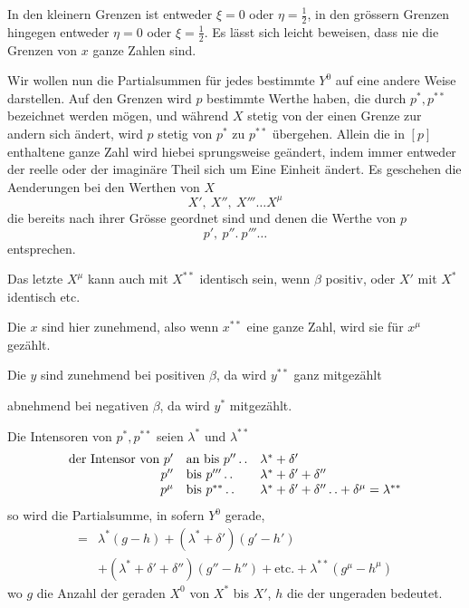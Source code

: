 In den kleinern Grenzen ist entweder $\xi=0$ oder $\eta=\frac12$, in den grössern Grenzen hingegen entweder $\eta=0$ oder $\xi=\frac12$. Es lässt sich leicht beweisen, dass nie die Grenzen von $x$ ganze Zahlen sind.

Wir wollen nun die Partialsummen für jedes bestimmte $Y^0$ auf eine andere Weise darstellen. Auf den Grenzen wird $p$ bestimmte Werthe haben, die durch $p^*,p^{**}$ bezeichnet werden mögen, und während $X$ stetig von der einen Grenze zur andern sich ändert, wird $p$ stetig von $p^*$ zu $p^{**}$ übergehen. Allein die in $[p]$ enthaltene ganze Zahl wird hiebei sprungsweise geändert, indem immer entweder der reelle oder der imaginäre Theil sich um Eine Einheit ändert. Es geschehen die Aenderungen bei den Werthen von $X$
\[
X',\ X'',\ X'''\ldots X^\mu
\]
die bereits nach ihrer Grösse geordnet sind und denen die Werthe von $p$
\[
p',\ p''.\ p'''\ldots
\]
entsprechen.

Das letzte $X^\mu$ kann auch mit $X^{**}$ identisch sein, wenn $\beta$ positiv, oder $X'$ mit $X^*$ identisch etc.

Die $x$ sind hier zunehmend, also wenn $x^{**}$ eine ganze Zahl, wird sie für $x^\mu$ gezählt.

Die $y$ sind zunehmend bei positiven $\beta$, da wird $y^{**}$ ganz mitgezählt
\begin{center}abnehmend bei negativen $\beta$, da wird $y^*$ mitgezählt.\end{center}

%
Die Intensoren von $p^*,p^{**}$ seien $\lambda^*$ und $\lambda^{**}$
\[
\begin{array}{rll}
\text{der Intensor von }p'&\text{an bis }p''\mathinner{.\,.}&\lambda^*+\delta'\\
p''&\text{bis }p'''\mathinner{.\,.}&\lambda^*+\delta'+\delta''\\
p^\mu&\text{bis }p^{**}\mathinner{.\,.}&\lambda^*+\delta'+\delta''\mathinner{.\,.}+\delta^\mu=\lambda^{**}
\end{array}
\]
so wird die Partialsumme, in sofern $Y^0$ gerade,
\[
\begin{aligned}
={}&\lambda^*(g-h)+(\lambda^*+\delta')(g'-h')\\
&+(\lambda^*+\delta'+\delta'')(g''-h'')+\text{etc.}+\lambda^{**}(g^\mu-h^\mu)
\end{aligned}
\]
wo $g$ die Anzahl der geraden $X^0$ von $X^*$ bis $X'$, $h$ die der ungeraden bedeutet.

